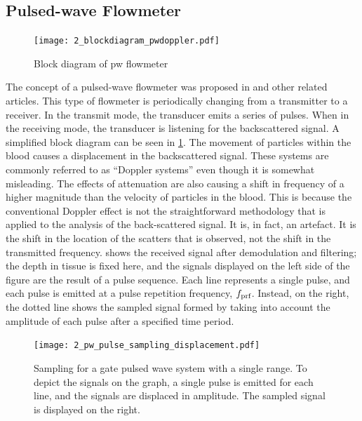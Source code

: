 \subsection{Pulsed-wave Flowmeter}
\begin{figure}[ht]
	\centering
	\texttt{[image: 2\_blockdiagram\_pwdoppler.pdf]}
	\caption[Block diagram of pulsed-wave flowmeter]{Block diagram of \gls{pw} flowmeter \cite{JensenUltrasoundBook}}
	\label{fig:2_devices_pw}
\end{figure}
The concept of a pulsed-wave flowmeter was proposed in \cite{Baker1970} and other related articles. This type of flowmeter is periodically changing from a transmitter to a receiver. In the transmit mode, the transducer emits a series of pulses. When in the receiving mode, the transducer is listening for the backscattered signal. A simplified block diagram can be seen in \cref{fig:2_devices_pw}. The movement of particles within the blood causes a displacement in the backscattered signal. These systems are commonly referred to as \enquote{Doppler systems} even though it is somewhat misleading. The effects of attenuation are also causing a shift in frequency of a higher magnitude than the velocity of particles in the blood. This is because the conventional Doppler effect is not the straightforward methodology that is applied to the analysis of the back-scattered signal. It is, in fact, an artefact. It is the shift in the location of the scatters that is observed, not the shift in the transmitted frequency.  shows the received signal after demodulation and filtering; the depth in tissue is fixed here, and the signals displayed on the left side of the figure are the result of a pulse sequence. Each line represents a single pulse, and each pulse is emitted at a pulse repetition frequency, $f_{\textup{prf}}$. Instead, on the right, the dotted line shows the sampled signal formed by taking into account the amplitude of each pulse after a specified time period.

\begin{figure}[ht]
	\centering
	\texttt{[image: 2\_pw\_pulse\_sampling\_displacement.pdf]}
	\caption[Sampling for a gate pulsed wave system with a single range]{Sampling for a gate pulsed wave system with a single range. To depict the signals on the graph, a single pulse is emitted for each line, and the signals are displaced in amplitude. The sampled signal is displayed on the right. \cite{JensenUltrasoundBook}}
	\label{fig:2_pw_sampling_displacement}
\end{figure}



